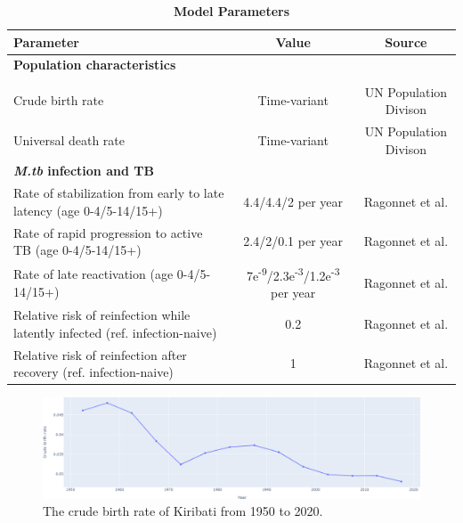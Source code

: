 \documentclass{article}
\begin{document}
\begin{table}[!htp]
    \caption{\textbf{Model Parameters}}
    \label{tab:parameter}
    \begin{threeparttable}
    \begin{tabularx}{\textwidth}{ X  c  c }
        \hline
        \textbf{Parameter} & \textbf{Value} & \textbf{Source} \\
        \hline
        \textbf{Population characteristics} & & \\
         \\
        Crude birth rate  & Time-variant & UN Population Divison \\
        Universal death rate & Time-variant & UN Population Divison \\
        \hline
        \textbf{\emph{M.tb} infection and TB} \\
        Rate of stabilization from early to late latency (age 0-4/5-14/15+) & 4.4/4.4/2 per year & Ragonnet et al.\cite{ragonnet-2022} \\
        Rate of rapid progression to active TB (age 0-4/5-14/15+) & 2.4/2/0.1 per year & Ragonnet et al.\cite{ragonnet-2022} \\
        Rate of late reactivation (age 0-4/5-14/15+) & 7e\textsuperscript{-9}/2.3e\textsuperscript{-3}/1.2e\textsuperscript{-3} per year & Ragonnet et al.\cite{ragonnet-2022} \\
        Relative risk of reinfection while latently infected (ref. infection-naive) & 0.2 & Ragonnet et al.\cite{ragonnet-2022} \\
        Relative risk of reinfection after recovery (ref. infection-naive) & 1 & Ragonnet et al.\cite{ragonnet-2022} \\
        \hline
	\end{tabularx}
    \end{threeparttable}
\end{table}

\begin{figure}[!htp]
   \includegraphics[width=\textwidth,keepaspectratio]{images/cbr.png}
    \caption{The crude birth rate of Kiribati from 1950 to 2020.}
    \label{fig:cbr}
\end{figure}
\end{document}
